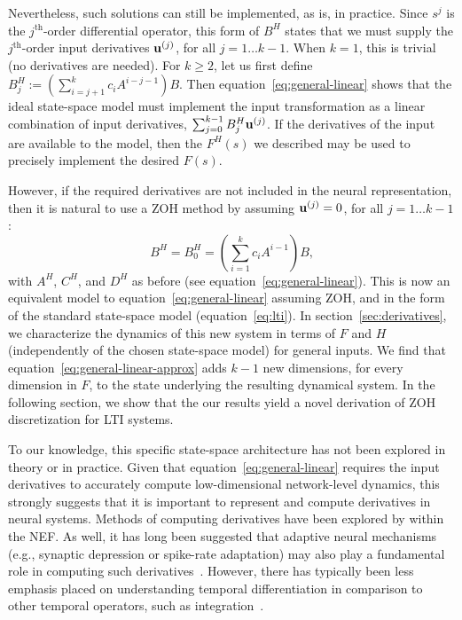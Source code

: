 Nevertheless, such solutions can still be implemented, as is, in practice.
Since $s^j$ is the $j^{\text{th}}$-order differential operator, this form of $B^H$ states that we must supply the $j^{\text{th}}$-order input derivatives $\mathbf{u}^{(j)}$, for all $j = 1 \ldots k - 1$.
When $k = 1$, this is trivial (no derivatives are needed).
For $k \ge 2$, let us first define $B^H_j:= \left( \sum_{i=j+1}^k c_i A^{i-j-1} \right) B$.
Then equation~\ref{eq:general-linear} shows that the ideal state-space model must implement the input transformation as a linear combination of input derivatives, $\sum_{j=0}^{k-1} B^H_j \mathbf{u}^{(j)}$.
If the derivatives of the input are available to the model, then the $F^{H}(s)$ we described may be used to precisely implement the desired $F(s)$.

However, if the required derivatives are not included in the neural representation, then it is natural to use a ZOH method by assuming $\mathbf{u}^{(j)} = 0$, for all $j = 1 \ldots k - 1$:
\begin{equation} \label{eq:general-linear-approx}
B^H = B^H_0 =  \left( \sum_{i=1}^k c_i A^{i-1} \right) B \text{,}
\end{equation}
with $A^H$, $C^H$, and $D^H$ as before (see equation~\ref{eq:general-linear}).
This is now an equivalent model to equation~\ref{eq:general-linear} assuming ZOH, and in the form of the standard state-space model (equation~\ref{eq:lti}).
In section~\ref{sec:derivatives}, we characterize the dynamics of this new system in terms of $F$ and $H$ (independently of the chosen state-space model) for general inputs.
We find that equation~\ref{eq:general-linear-approx} adds $k - 1$ new dimensions, for every dimension in $F$, to the state underlying the resulting dynamical system.
In the following section, we show that the our results yield a novel derivation of ZOH discretization for LTI systems.

To our knowledge, this specific state-space architecture has not been explored in theory or in practice.
Given that equation~\ref{eq:general-linear} requires the input derivatives to accurately compute low-dimensional network-level dynamics, this strongly suggests that it is important to represent and compute derivatives in neural systems.
Methods of computing derivatives have been explored by \citet{tripp2010} within the NEF.
As well, it has long been suggested that adaptive neural mechanisms (e.g., synaptic depression or spike-rate adaptation) may also play a fundamental role in computing such derivatives~\citep{abbott2004synaptic, lundstrom2008fractional}.
However, there has typically been less emphasis placed on understanding temporal differentiation in comparison to other temporal operators, such as integration~\citep{tripp2010}.

